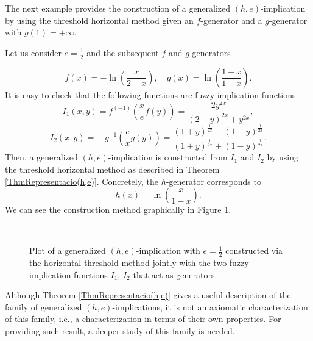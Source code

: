 The next example provides the construction of a generalized $(h,e)$-implication by using the threshold horizontal method given an $f$-generator and a $g$-generator with $g(1)=+\infty$.
\begin{example} Let us consider $e=\frac{1}{2}$ and the subsequent $f$ and $g$-generators
	
	$$ f(x)= - \ln \left( \frac{x}{2-x} \right), \quad g(x)=\ln \left( \frac{1+x}{1-x}\right).$$
	It is easy to check that the following functions are fuzzy implication functions
	$$I_1(x,y)=f^{(-1)}\left(\frac{x}{e} f(y)\right)= \frac{2y^{2x}}{(2-y)^{2x}+y^{2x}},$$
	$$ I_2(x,y)=\quad g^{-1}\left(\frac{e}{x}g(y)\right)=\frac{(1+y)^{\frac{1}{2x}}-(1-y)^{\frac{1}{2x}}}{(1+y)^{\frac{1}{2x}}+(1-y)^{\frac{1}{2x}}}.$$
	Then, a generalized $(h,e)$-implication is constructed from $I_1$ and $I_2$ by using the threshold horizontal method as described in Theorem \ref{ThmRepresentacio(h,e)}. Concretely, the $h$-generator corresponds to  
	$$h(x)=  \ln \left( \frac{x}{1-x}\right).$$
	We can see the construction method graphically in Figure \ref{thresholdimpl}.
	
	\begin{figure}[H]
		\centering
		\\
		
		\caption[Plot of a generalized $(h,e)$-implication constructed via the horizontal threshold method jointly with the two fuzzy implication functions that act as generators.]{Plot of a generalized $(h,e)$-implication with $e=\frac{1}{2}$ constructed via the horizontal threshold method jointly with the two fuzzy implication functions $I_1$, $I_2$ that act as generators.}\label{thresholdimpl}
	\end{figure}
	\label{ExempleRepresentació(h,e)}
\end{example}

Although Theorem \ref{ThmRepresentacio(h,e)} gives a useful description of the family of generalized $(h,e)$-implications, it is not an axiomatic characterization of this family, i.e., a characterization in terms of their own properties. For providing such result, a deeper study of this family is needed.

